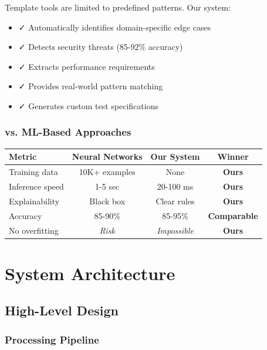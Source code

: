 \documentclass[12pt,oneside]{report}
\begin{document}
Template tools are limited to predefined patterns. Our system:
\begin{itemize}
    \item ✓ Automatically identifies domain-specific edge cases
    \item ✓ Detects security threats (85-92\% accuracy)
    \item ✓ Extracts performance requirements
    \item ✓ Provides real-world pattern matching
    \item ✓ Generates custom test specifications
\end{itemize}

\subsection{vs. ML-Based Approaches}

\begin{table}[H]
\centering
\begin{tabular}{|l|c|c|c|}
\hline
\textbf{Metric} & \textbf{Neural Networks} & \textbf{Our System} & \textbf{Winner} \\
\hline
Training data & 10K+ examples & None & \textbf{Ours} \\
Inference speed & 1-5 sec & 20-100 ms & \textbf{Ours} \\
Explainability & Black box & Clear rules & \textbf{Ours} \\
Accuracy & 85-90\% & 85-95\% & \textbf{Comparable} \\
No overfitting & \textit{Risk} & \textit{Impossible} & \textbf{Ours} \\
\hline
\end{tabular}
\end{table}


\chapter{System Architecture}

\section{High-Level Design}

\subsection{Processing Pipeline}
\end{document}
